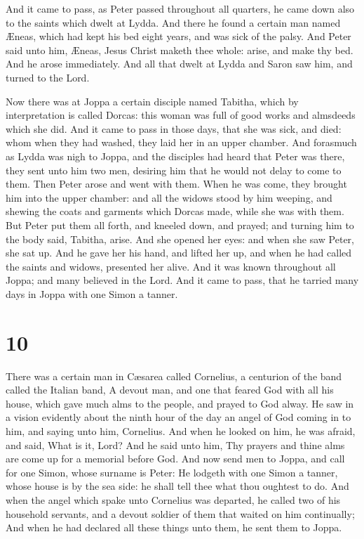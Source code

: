  And it came to pass, as Peter passed throughout all
quarters, he came down also to the saints which dwelt at Lydda.
 And there he found a certain man named Æneas, which had
kept his bed eight years, and was sick of the palsy.  And
Peter said unto him, Æneas, Jesus Christ maketh thee whole: arise, and
make thy bed. And he arose immediately.  And all that dwelt
at Lydda and Saron saw him, and turned to the Lord.

 Now there was at Joppa a certain disciple named Tabitha,
which by interpretation is called Dorcas: this woman was full of good
works and almsdeeds which she did.  And it came to pass in
those days, that she was sick, and died: whom when they had washed, they
laid her in an upper chamber.  And forasmuch as Lydda was
nigh to Joppa, and the disciples had heard that Peter was there, they
sent unto him two men, desiring him that he would not delay to come to
them.  Then Peter arose and went with them. When he was
come, they brought him into the upper chamber: and all the widows stood
by him weeping, and shewing the coats and garments which Dorcas made,
while she was with them.  But Peter put them all forth, and
kneeled down, and prayed; and turning him to the body said, Tabitha,
arise. And she opened her eyes: and when she saw Peter, she sat up.
 And he gave her his hand, and lifted her up, and when he
had called the saints and widows, presented her alive.  And
it was known throughout all Joppa; and many believed in the Lord.
 And it came to pass, that he tarried many days in Joppa
with one Simon a tanner.

\hypertarget{section-9}{%
\section{10}\label{section-9}}

 There was a certain man in Cæsarea called Cornelius, a
centurion of the band called the Italian band,  A devout
man, and one that feared God with all his house, which gave much alms to
the people, and prayed to God alway.  He saw in a vision
evidently about the ninth hour of the day an angel of God coming in to
him, and saying unto him, Cornelius.  And when he looked on
him, he was afraid, and said, What is it, Lord? And he said unto him,
Thy prayers and thine alms are come up for a memorial before God.
 And now send men to Joppa, and call for one Simon, whose
surname is Peter:  He lodgeth with one Simon a tanner, whose
house is by the sea side: he shall tell thee what thou oughtest to do.
 And when the angel which spake unto Cornelius was departed,
he called two of his household servants, and a devout soldier of them
that waited on him continually;  And when he had declared
all these things unto them, he sent them to Joppa.

